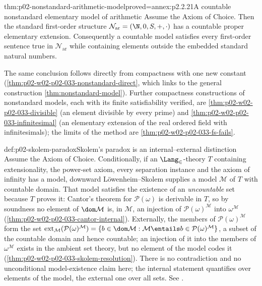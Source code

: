 \begin{hbcorollary}{thm:p02-nonstandard-arithmetic-model}{proved=annex:p2.2.21}{A countable nonstandard elementary model of arithmetic}
Assume the Axiom of Choice.  Then the standard first-order structure
\(\mathcal N_{\mathrm{ar}}=(\N,0,S,+,\cdot)\) has a countable proper
elementary extension.  Consequently a countable model satisfies every
first-order sentence true in \(\mathcal N_{\mathrm{ar}}\) while containing
elements outside the embedded standard natural numbers.
\end{hbcorollary}

The same conclusion follows directly from compactness with one new constant
(\cref{thm:p02-w02-p02-033-nonstandard-direct}, which links to the general
construction \cref{thm:nonstandard-model}).  Further compactness
constructions of nonstandard models, each with its finite satisfiability
verified, are \cref{thm:p02-w02-p02-033-divisible} (an element divisible by
every prime) and \cref{thm:p02-w02-p02-033-infinitesimal} (an elementary
extension of the real ordered field with infinitesimals); the limits of the
method are \cref{thm:p02-w02-p02-033-fs-fails}.

\begin{hbwarning}{def:p02-skolem-paradox}{Skolem's paradox is an internal--external distinction}
Assume the Axiom of Choice.  Conditionally, if an \(\Lang_{\in}\)-theory
\(T\) containing extensionality, the power-set axiom, every separation
instance and the axiom of infinity has a model, downward
L\"owenheim--Skolem supplies a model \(\mathcal M\) of \(T\) with countable
domain.  That model satisfies the existence of an \emph{uncountable} set
because \(T\) proves it: Cantor's theorem for \(\mathcal P(\omega)\) is
derivable in \(T\), so by soundness no element of \(\dom\mathcal M\) is,
in \(\mathcal M\), an injection of \(\mathcal P(\omega)^{\mathcal M}\) into
\(\omega^{\mathcal M}\) (\cref{thm:p02-w02-p02-033-cantor-internal}).
Externally, the members of \(\mathcal P(\omega)^{\mathcal M}\) form the set
\(\operatorname{ext}_{\mathcal M}(\mathcal P(\omega)^{\mathcal M})=
\{b\in\dom\mathcal M:\mathcal M\entails b\in\mathcal P(\omega)^{\mathcal M}\}\),
a subset of the countable domain and hence countable; an injection of it into
the members of \(\omega^{\mathcal M}\) exists in the ambient set theory, but
no element of the model codes it
(\cref{thm:p02-w02-p02-033-skolem-resolution}).  There is no contradiction
and no unconditional model-existence claim here; the internal statement
quantifies over elements of the model, the external one over all sets.  See
\cite{Skolem1923SetTheory,Hodges1993}.
\end{hbwarning}
